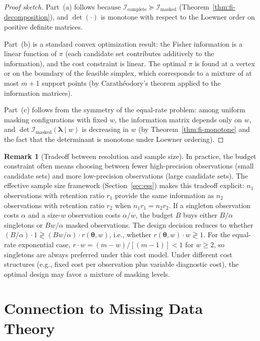 \documentclass[11pt]{article}
\theoremstyle{definition}
\newtheorem{remark}{Remark}
\theoremstyle{plain}
\renewcommand{\v}[1]{\boldsymbol{#1}}
\newcommand{\btheta}{\v{\theta}}
\newcommand{\FI}{\mathcal{I}}       %
\begin{document}
\begin{proof}[Proof sketch]
Part~(a) follows because $\FI_{\mathrm{complete}} \succeq
\FI_{\mathrm{masked}}$ (Theorem~\ref{thm:fi-decomposition}), and
$\det(\cdot)$ is monotone with respect to the Loewner order on
positive definite matrices.

Part~(b) is a standard convex optimization result: the Fisher
information is a linear function of $\pi$ (each candidate set
contributes additively to the information), and the cost constraint
is linear.
The optimal $\pi$ is found at a vertex or on the boundary of the
feasible simplex, which corresponds to a mixture of at most $m + 1$
support points (by Carath\'eodory's theorem applied to the information
matrices).

Part~(c) follows from the symmetry of the equal-rate problem:
among uniform masking configurations with fixed $w$, the information
matrix depends only on $w$, and
$\det \FI_{\mathrm{masked}}(\v{\lambda} \mid w)$ is decreasing
in $w$ (by Theorem~\ref{thm:fi-monotone} and the fact that the
determinant is monotone under Loewner ordering).
\end{proof}

\begin{remark}[Tradeoff between resolution and sample size]
\label{rem:design-tradeoff}
In practice, the budget constraint often means choosing between
fewer high-precision observations (small candidate sets) and more
low-precision observations (large candidate sets).
The effective sample size framework
(Section~\ref{sec:ess}) makes this tradeoff explicit:
$n_1$ observations with retention ratio $r_1$ provide the same
information as $n_2$ observations with retention ratio $r_2$ when
$n_1 r_1 = n_2 r_2$.
If a singleton observation costs $\alpha$ and a size-$w$ observation
costs $\alpha/w$, the budget $B$ buys either $B/\alpha$ singletons
or $Bw/\alpha$ masked observations.
The design decision reduces to whether
$(B/\alpha) \cdot 1 \gtrless (Bw/\alpha) \cdot r(\btheta, w)$,
i.e., whether $r(\btheta, w) \cdot w \gtrless 1$.
For the equal-rate exponential case,
$r \cdot w = (m - w)/[(m-1)] < 1$ for $w \geq 2$, so singletons
are always preferred under this cost model.
Under different cost structures (e.g., fixed cost per observation
plus variable diagnostic cost), the optimal design may favor a
mixture of masking levels.
\end{remark}


\section{Connection to Missing Data Theory}
\label{sec:missing-data}
\end{document}

